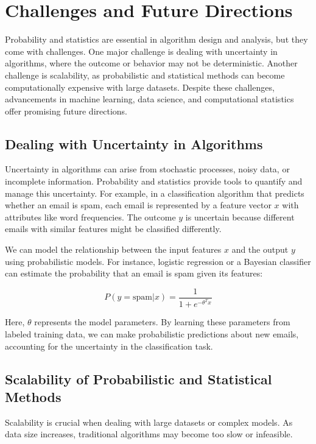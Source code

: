 \documentclass[12pt]{book} %
\begin{document}
\section{Challenges and Future Directions}

Probability and statistics are essential in algorithm design and analysis, but they come with challenges. One major challenge is dealing with uncertainty in algorithms, where the outcome or behavior may not be deterministic. Another challenge is scalability, as probabilistic and statistical methods can become computationally expensive with large datasets. Despite these challenges, advancements in machine learning, data science, and computational statistics offer promising future directions.

\subsection{Dealing with Uncertainty in Algorithms}

Uncertainty in algorithms can arise from stochastic processes, noisy data, or incomplete information. Probability and statistics provide tools to quantify and manage this uncertainty. For example, in a classification algorithm that predicts whether an email is spam, each email is represented by a feature vector \(x\) with attributes like word frequencies. The outcome \(y\) is uncertain because different emails with similar features might be classified differently.

We can model the relationship between the input features \(x\) and the output \(y\) using probabilistic models. For instance, logistic regression or a Bayesian classifier can estimate the probability that an email is spam given its features:

\[
P(y = \text{spam} | x) = \frac{1}{1 + e^{-\theta^Tx}}
\]

Here, \(\theta\) represents the model parameters. By learning these parameters from labeled training data, we can make probabilistic predictions about new emails, accounting for the uncertainty in the classification task.

\subsection{Scalability of Probabilistic and Statistical Methods}

Scalability is crucial when dealing with large datasets or complex models. As data size increases, traditional algorithms may become too slow or infeasible. 
\end{document}
